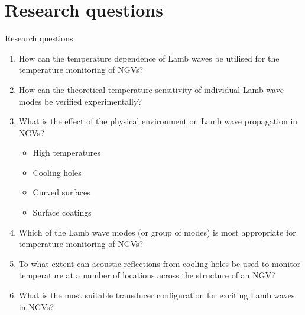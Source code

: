 \documentclass[aspectratio=169, 9pt]{beamer}
\begin{document}

\section{Research questions}
\begin{frame}{Research questions}

  \begin{enumerate}
      \item How can the temperature dependence of Lamb waves be utilised for the temperature monitoring of NGVs?\label{itm:1}
      \item How can the theoretical temperature sensitivity of individual Lamb wave modes be verified experimentally?\label{itm:2}
      \item What is the effect of the physical environment on Lamb wave propagation in NGVs?\label{itm:3}
  \begin{itemize}
      \item High temperatures
      \item Cooling holes
      \item Curved surfaces
      \item Surface coatings
  \end{itemize}
      \item Which of the Lamb wave modes (or group of modes) is most appropriate for temperature monitoring of NGVs?\label{itm:4}
      \item To what extent can acoustic reflections from cooling holes be used to monitor temperature at a number of locations across the structure of an NGV?\label{itm:5}
      \item What is the most suitable transducer configuration for exciting Lamb waves in NGVs?\label{itm:6}
  \end{enumerate}
\end{frame}

\end{document}
